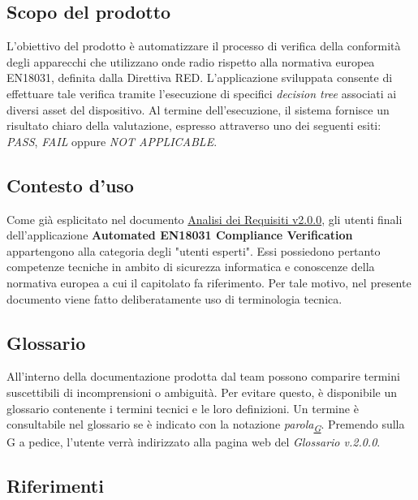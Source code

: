 \documentclass[a4paper,12pt]{article}
\begin{document}
    \subsection{Scopo del prodotto}
        L'obiettivo del prodotto è automatizzare il processo di verifica della conformità degli apparecchi che utilizzano onde radio rispetto alla normativa europea EN18031, definita dalla Direttiva RED. \newline
        L'applicazione sviluppata consente di effettuare tale verifica tramite l'esecuzione di specifici \textit{decision tree} associati ai diversi asset del dispositivo. Al termine dell'esecuzione, il sistema fornisce un risultato chiaro della valutazione, espresso attraverso uno dei seguenti esiti: \textit{PASS}, \textit{FAIL} oppure \textit{NOT APPLICABLE}.

    \subsection{Contesto d'uso}
        Come già esplicitato nel documento \href{https://atlasteam9.github.io/Atlas/docs/PB/documenti/esterni/Analisi%20dei%20Requisiti.pdf}{Analisi dei Requisiti v2.0.0}, gli utenti finali dell'applicazione \textbf{Automated EN18031 Compliance Verification} appartengono alla categoria degli "utenti esperti". Essi possiedono pertanto competenze tecniche in ambito di sicurezza informatica e conoscenze della normativa europea a cui il capitolato fa riferimento. \newline
        Per tale motivo, nel presente documento viene fatto deliberatamente uso di terminologia tecnica.

    \subsection{Glossario}
        All'interno della documentazione prodotta dal team possono comparire termini suscettibili di incomprensioni o ambiguità. Per evitare questo, è disponibile un glossario
        contenente i termini tecnici e le loro definizioni. Un termine è consultabile nel glossario se è indicato con la notazione \textit{parola\textsubscript{\href{https://atlasteam9.github.io/Atlas/glossario.html}{G}}}.
        Premendo sulla G a pedice, l'utente verrà indirizzato alla pagina web del \textit{Glossario v.2.0.0}.
    

    \subsection{Riferimenti}
\end{document}
